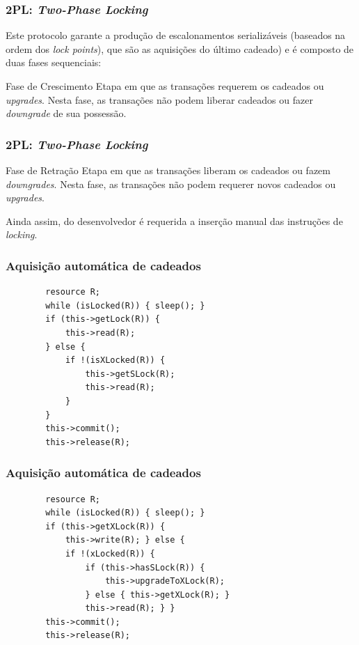 \documentclass{beamer}
\begin{document}
\begin{frame} %
    \frametitle{2PL: \emph{Two-Phase Locking}}

    Este protocolo garante a produção de escalonamentos serializáveis (baseados na ordem dos \emph{lock points}), que são as aquisições do último cadeado) e é composto de duas fases sequenciais:

    \medskip
    \begin{block}{Fase de Crescimento}
        Etapa em que as transações requerem os cadeados ou \emph{upgrades}. Nesta fase, as transações não podem liberar cadeados ou fazer \emph{downgrade} de sua possessão.
    \end{block}
\end{frame}


\begin{frame} %
    \frametitle{2PL: \emph{Two-Phase Locking}}
    
    \begin{block}{Fase de Retração}
        Etapa em que as transações liberam os cadeados ou fazem \emph{downgrades}. Nesta fase, as transações não podem requerer novos cadeados ou \emph{upgrades}.
    \end{block}

    \medskip
    Ainda assim, do desenvolvedor é requerida a inserção manual das instruções de \emph{locking}.
\end{frame}


\begin{frame}[fragile] %
    \frametitle{Aquisição automática de cadeados}
    \begin{example}
    \begin{verbatim}
        resource R;
        while (isLocked(R)) { sleep(); }
        if (this->getLock(R)) {
            this->read(R);
        } else {
            if !(isXLocked(R)) {
                this->getSLock(R);
                this->read(R);
            }
        }
        this->commit();
        this->release(R);
    \end{verbatim}
    \end{example}
\end{frame}


\begin{frame}[fragile] %
    \frametitle{Aquisição automática de cadeados}

    \begin{example}
    \begin{verbatim}
        resource R;
        while (isLocked(R)) { sleep(); }
        if (this->getXLock(R)) {
            this->write(R); } else {
            if !(xLocked(R)) {
                if (this->hasSLock(R)) {
                    this->upgradeToXLock(R);
                } else { this->getXLock(R); }
                this->read(R); } }
        this->commit();
        this->release(R);
    \end{verbatim}
    \end{example}
\end{frame}
\end{document}
